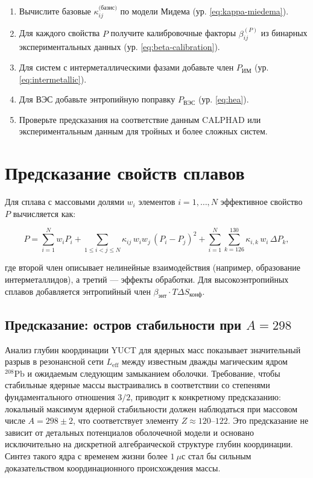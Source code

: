 \documentclass[12pt,a4paper]{article}
\begin{document}
	\begin{enumerate}
		\item Вычислите базовые \(\kappa_{ij}^{\text{(базис)}}\) по модели Мидема (ур. \ref{eq:kappa-miedema}).
		\item Для каждого свойства \(P\) получите калибровочные факторы \(\beta_{ij}^{(P)}\) из бинарных экспериментальных данных (ур. \ref{eq:beta-calibration}).
		\item Для систем с интерметаллическими фазами добавьте член \(P_{\text{ИМ}}\) (ур. \ref{eq:intermetallic}).
		\item Для ВЭС добавьте энтропийную поправку \(P_{\text{ВЭС}}\) (ур. \ref{eq:hea}).
		\item Проверьте предсказания на соответствие данным CALPHAD или экспериментальным данным для тройных и более сложных систем.
	\end{enumerate}
	
	\section{Предсказание свойств сплавов}
	
	Для сплава с массовыми долями \(w_i\) элементов \(i = 1,\dots,N\) эффективное свойство \(P\) вычисляется как:
	
	\[
	P = \sum_{i=1}^{N} w_i P_i
	+ \sum_{1\le i<j\le N} \kappa_{ij}\, w_i w_j\, (P_i - P_j)^2
	+ \sum_{i=1}^{N} \sum_{k=126}^{130} \kappa_{i,k}\, w_i\, \Delta P_k,
	\]
	
	где второй член описывает нелинейные взаимодействия (например, образование интерметаллидов), а третий — эффекты обработки. Для высокоэнтропийных сплавов добавляется энтропийный член \(\beta_{\text{энт}} \cdot T \Delta S_{\text{конф}}\).
	
	\subsection{Предсказание: остров стабильности при \(A=298\)}
	
	Анализ глубин координации YUCT для ядерных масс показывает значительный разрыв в резонансной сети \(L_{\mathrm{eff}}\) между известным дважды магическим ядром \(^{208}\mathrm{Pb}\) и ожидаемым следующим замыканием оболочки. Требование, чтобы стабильные ядерные массы выстраивались в соответствии со степенями фундаментального отношения \(3/2\), приводит к конкретному предсказанию: локальный максимум ядерной стабильности должен наблюдаться при массовом числе \(A = 298 \pm 2\), что соответствует элементу \(Z \approx 120\)–\(122\). Это предсказание не зависит от детальных потенциалов оболочечной модели и основано исключительно на дискретной алгебраической структуре глубин координации. Синтез такого ядра с временем жизни более \(1\ \mu\text{с}\) стал бы сильным доказательством координационного происхождения массы.
	
\end{document}
